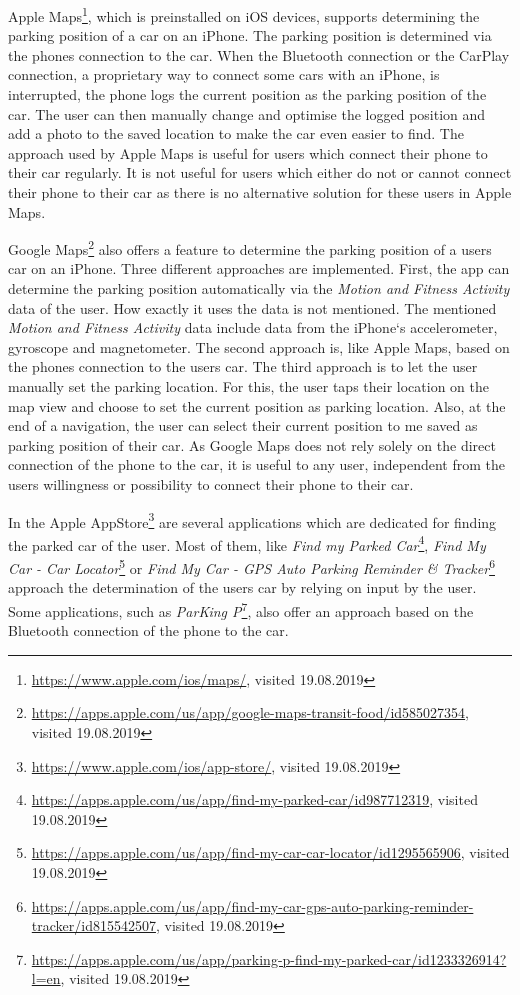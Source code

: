Apple Maps\footnote{\url{https://www.apple.com/ios/maps/}, visited 19.08.2019}, which is preinstalled on iOS devices, supports determining the parking position of a car on an iPhone.  The parking position is determined via the phones connection to the car. When the Bluetooth connection or the CarPlay connection, a proprietary way to connect some cars with an iPhone, is interrupted, the phone logs the current position as the parking position of the car. The user can then manually change and optimise the logged position and add a photo to the saved location to make the car even easier to find. The approach used by Apple Maps is useful for users which connect their phone to their car regularly. It is not useful for users which either do not or cannot connect their phone to their car as there is no alternative solution for these users in Apple Maps. \cite{apple:maps:parkedcar}

Google Maps\footnote{\url{https://apps.apple.com/us/app/google-maps-transit-food/id585027354}, visited 19.08.2019} also offers a feature to determine the parking position of a users car on an iPhone. Three different approaches are implemented. First,  the app can determine the parking position automatically via the \textit{Motion and Fitness Activity} data of the user. How exactly it uses the data is not mentioned. The mentioned \textit{Motion and Fitness Activity} data include data from the iPhone`s accelerometer, gyroscope and magnetometer. The second approach is, like Apple Maps, based on the phones connection to the users car. The third approach is to let the user manually set the parking location. For this, the user taps their location on the map view and choose to set the current position as parking location. Also, at the end of a navigation, the user can select their current position to me saved as parking position of their car. As Google Maps does not rely solely on the direct connection of the phone to the car, it is useful to any user, independent from the users willingness or possibility to connect their phone to their car. \cite{google:maps:app:parkedcar}  \cite{apple:CoreMotion}

In the Apple AppStore\footnote{\url{https://www.apple.com/ios/app-store/}, visited 19.08.2019} are several applications which are dedicated for finding the parked car of the user. Most of them, like \textit{Find my Parked Car}\footnote{\url{https://apps.apple.com/us/app/find-my-parked-car/id987712319}, visited 19.08.2019}, \textit{Find My Car - Car Locator}\footnote{\url{https://apps.apple.com/us/app/find-my-car-car-locator/id1295565906}, visited 19.08.2019} or \textit{Find My Car - GPS Auto Parking Reminder \& Tracker}\footnote{\url{https://apps.apple.com/us/app/find-my-car-gps-auto-parking-reminder-tracker/id815542507}, visited 19.08.2019} approach the determination of the users car by relying on input by the user. Some applications, such as \textit{ParKing P}\footnote{\url{https://apps.apple.com/us/app/parking-p-find-my-parked-car/id1233326914?l=en}, visited 19.08.2019}, also offer an approach based on the Bluetooth connection of the phone to the car. 

